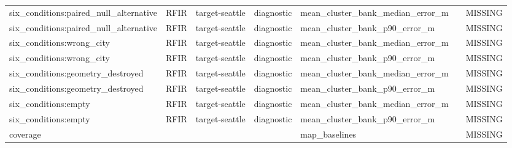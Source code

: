 \begin{longtable}{lllllll}
six\_conditions:paired\_null\_alternative & RFIR & target-seattle & diagnostic & mean\_cluster\_bank\_median\_error\_m &  & MISSING \\
six\_conditions:paired\_null\_alternative & RFIR & target-seattle & diagnostic & mean\_cluster\_bank\_p90\_error\_m &  & MISSING \\
six\_conditions:wrong\_city & RFIR & target-seattle & diagnostic & mean\_cluster\_bank\_median\_error\_m &  & MISSING \\
six\_conditions:wrong\_city & RFIR & target-seattle & diagnostic & mean\_cluster\_bank\_p90\_error\_m &  & MISSING \\
six\_conditions:geometry\_destroyed & RFIR & target-seattle & diagnostic & mean\_cluster\_bank\_median\_error\_m &  & MISSING \\
six\_conditions:geometry\_destroyed & RFIR & target-seattle & diagnostic & mean\_cluster\_bank\_p90\_error\_m &  & MISSING \\
six\_conditions:empty & RFIR & target-seattle & diagnostic & mean\_cluster\_bank\_median\_error\_m &  & MISSING \\
six\_conditions:empty & RFIR & target-seattle & diagnostic & mean\_cluster\_bank\_p90\_error\_m &  & MISSING \\
coverage &  &  &  & map\_baselines &  & MISSING \\
\bottomrule
\end{longtable}
